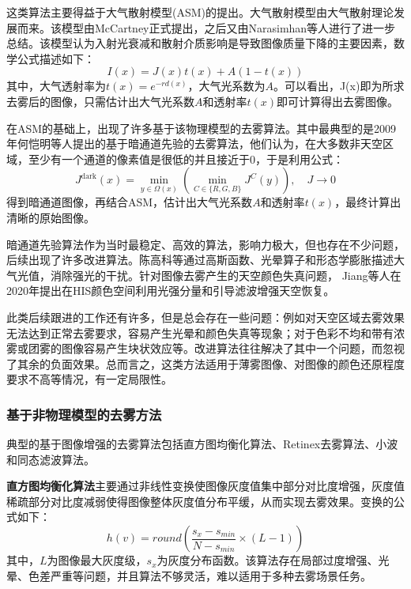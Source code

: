 \documentclass{article}
\begin{document}
这类算法主要得益于大气散射模型(ASM)的提出。大气散射模型由大气散射理论\cite{mccartney1976optics}发展而来。该模型由McCartney正式提出，之后又由Narasimhan等人进行了进一步总结\cite{narasimhan2002vision}。该模型认为入射光衰减和散射介质影响是导致图像质量下降的主要因素，数学公式描述如下：
\begin{equation}
  I(x) = J(x)t(x) + A(1-t(x))
  \label{eq:asm}
\end{equation}
其中，大气透射率为$t(x)=e^{-rd(x)}$，大气光系数为$A$。可以看出，J(x)即为所求去雾后的图像，只需估计出大气光系数$A$和透射率$t(x)$即可计算得出去雾图像。

在ASM的基础上，出现了许多基于该物理模型的去雾算法。其中最典型的是2009年何恺明等人提出的基于暗通道先验的去雾算法\cite{he2010single}，他们认为，在大多数非天空区域，至少有一个通道的像素值是很低的并且接近于0，于是利用公式：
\begin{equation}
  J^{\text{dark}}(x) = \min_{y \in \Omega(x)} \left( \min_{C \in \{R, G, B\}} J^C(y) \right), \quad J \to 0
  \label{eq:darkchannel}
\end{equation}
得到暗通道图像，再结合ASM，估计出大气光系数$A$和透射率$t(x)$，最终计算出清晰的原始图像。

暗通道先验算法作为当时最稳定、高效的算法，影响力极大，但也存在不少问题，后续出现了许多改进算法。陈高科等\cite{chen2017improved}通过高斯函数、光晕算子和形态学膨胀描述大气光值，消除强光的干扰。针对图像去雾产生的天空颜色失真问题， Jiang等人\cite{jiang2020image}在2020年提出在HIS颜色空间利用光强分量和引导滤波增强天空恢复。

此类后续跟进的工作还有许多，但是总会存在一些问题：例如对天空区域去雾效果无法达到正常去雾要求，容易产生光晕和颜色失真等现象；对于色彩不均和带有浓雾或团雾的图像容易产生块状效应等。改进算法往往解决了其中一个问题，而忽视了其余的负面效果。总而言之，这类方法适用于薄雾图像、对图像的颜色还原程度要求不高等情况，有一定局限性。

\subsubsection{基于非物理模型的去雾方法}

典型的基于图像增强的去雾算法包括直方图均衡化算法、Retinex去雾算法、小波和同态滤波算法。

\textbf{直方图均衡化算法}主要通过非线性变换使图像灰度值集中部分对比度增强，灰度值稀疏部分对比度减弱使得图像整体灰度值分布平缓，从而实现去雾效果。变换的公式如下：
\begin{equation}
  h(v) = round(\frac{s_x - s_{min}}{N - s_{min}} \times (L-1))
  \label{eq:zhifang}
\end{equation}
其中，$L$为图像最大灰度级，$s_x$为灰度分布函数。该算法存在局部过度增强、光晕、色差严重等问题，并且算法不够灵活，难以适用于多种去雾场景任务。
\end{document}
